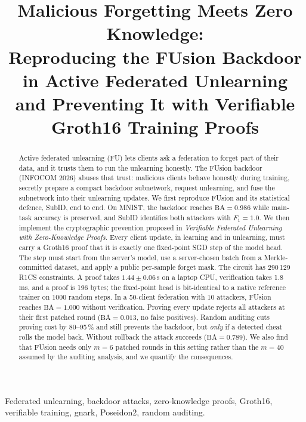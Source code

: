 \documentclass[conference]{IEEEtran}
\newcommand{\BA}{\textrm{BA}}
\begin{document}
\title{Malicious Forgetting Meets Zero Knowledge:\\
Reproducing the FUsion Backdoor in Active Federated Unlearning\\
and Preventing It with Verifiable Groth16 Training Proofs}

\author{}

\maketitle

\begin{abstract}
Active federated unlearning (FU) lets clients ask a federation to forget part of their data, and it
trusts them to run the unlearning honestly. The FUsion backdoor (INFOCOM 2026) abuses that trust:
malicious clients behave honestly during training, secretly prepare a compact backdoor subnetwork,
request unlearning, and fuse the subnetwork into their unlearning updates. We first reproduce
FUsion and its statistical defence, SubID, end to end. On MNIST, the backdoor reaches
$\BA=0.986$ while main-task accuracy is preserved, and SubID identifies both attackers with
$F_1=1.0$. We then implement the cryptographic prevention proposed in \emph{Verifiable Federated
Unlearning with Zero-Knowledge Proofs}. Every client update, in learning and in unlearning, must
carry a Groth16 proof that it is exactly one fixed-point SGD step of the model head. The step must
start from the server's model, use a server-chosen batch from a Merkle-committed dataset, and apply
a public per-sample forget mask. The circuit has 290\,129 R1CS constraints. A proof takes
$1.44\pm0.06$\,s on a laptop CPU, verification takes 1.8\,ms, and a proof is 196 bytes; the
fixed-point head is bit-identical to a native reference trainer on 1000 random steps. In a
50-client federation with 10 attackers, FUsion reaches $\BA=1.000$ without verification. Proving
every update rejects all attackers at their first patched round ($\BA=0.013$, no false positives).
Random auditing cuts proving cost by 80--95\,\% and still prevents the backdoor, but \emph{only} if
a detected cheat rolls the model back. Without rollback the attack succeeds ($\BA=0.789$). We also
find that FUsion needs only $m=6$ patched rounds in this setting rather than the $m=40$ assumed by
the auditing analysis, and we quantify the consequences.
\end{abstract}

\begin{IEEEkeywords}
Federated unlearning, backdoor attacks, zero-knowledge proofs, Groth16, verifiable training, gnark,
Poseidon2, random auditing.
\end{IEEEkeywords}
\end{document}
